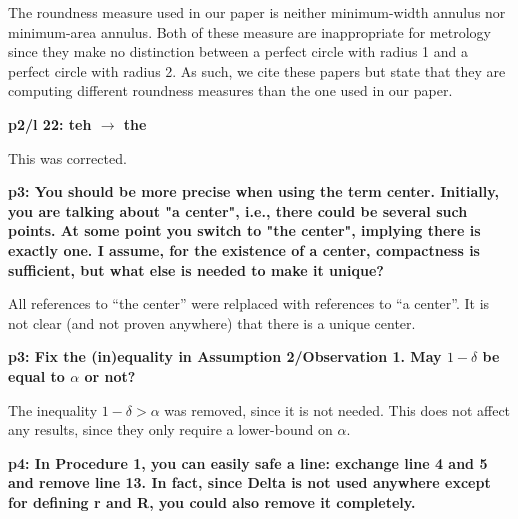 \documentclass[lotsofwhite]{patmorin}
\newenvironment{comment}{\noindent\bf}{}
\newenvironment{response}{\noindent}{}
\begin{document}
\begin{response}
The roundness measure used in our paper is neither minimum-width
annulus nor minimum-area annulus. Both of these measure are
inappropriate for metrology since they make no distinction between a
perfect circle with radius 1 and a perfect circle with radius 2.  As
such, we cite these papers but state that they are computing different
roundness measures than the one used in our paper.
\end{response}

\begin{comment}
p2/l 22: teh $\rightarrow$ the
\end{comment}

\begin{response}
This was corrected.
\end{response}

\begin{comment}
p3: You should be more precise when using the term center. Initially,
you are talking about "a center", i.e., there could be several such
points. At some point you switch to "the center", implying there is
exactly one. I assume, for the existence of a center, compactness is
sufficient, but what else is needed to make it unique?
\end{comment}

\begin{response}
All references to ``the center'' were relplaced with references to ``a
center''.  It is not clear (and not proven anywhere) that there is a
unique center.
\end{response}

\begin{comment}
p3: Fix the (in)equality in Assumption 2/Observation 1. May $1-\delta$
be equal to $\alpha$ or not?
\end{comment}

\begin{response}
The inequality $1-\delta>\alpha$ was removed, since it is not needed.
This does not affect any results, since they only require a
lower-bound on $\alpha$.
\end{response}


\begin{comment}
p4: In Procedure 1, you can easily safe a line: exchange line 4 and 5
and remove line 13. In fact, since Delta is not used anywhere except
for defining r and R, you could also remove it completely.
\end{comment}
\end{document}

